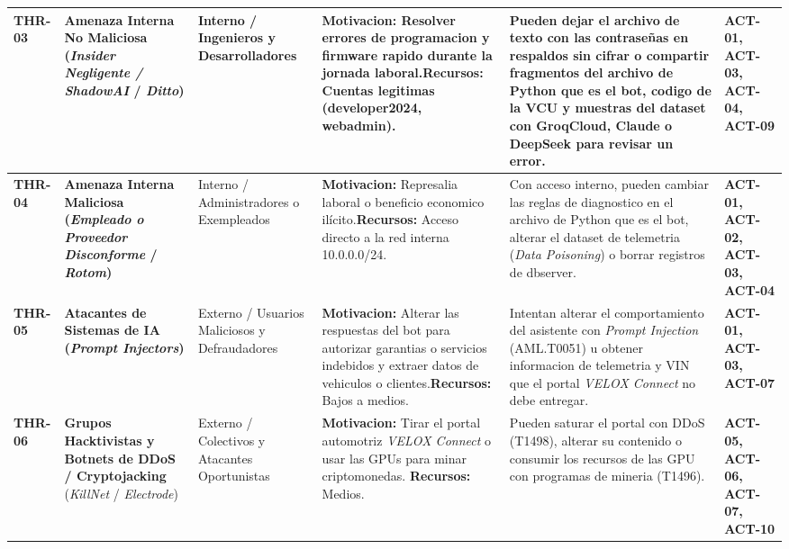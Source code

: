 \documentclass[letterpaper,11pt]{article}
\begin{document}
\begin{longtable}{|C{1.3cm}|L{2.9cm}|L{2.2cm}|L{2.8cm}|L{4.95cm}|C{2.0cm}|}
\textbf{THR-03}
  & \textbf{Amenaza Interna No Maliciosa (\textit{Insider Negligente /
ShadowAI} / \textit{Ditto})}
  & Interno / Ingenieros y Desarrolladores
  & \textbf{Motivacion:} Resolver errores de programacion y firmware
rapido durante la jornada laboral.\newline \textbf{Recursos:}
Cuentas legitimas (developer2024, webadmin).
  & Pueden dejar el archivo de texto con las contraseñas en respaldos
sin cifrar o compartir fragmentos del archivo de Python que es el
bot, codigo de la VCU y muestras del dataset con GroqCloud, Claude o
DeepSeek para revisar un error.
  & \textbf{ACT-01, ACT-03, ACT-04, ACT-09} \\
\hline

\textbf{THR-04}
  & \textbf{Amenaza Interna Maliciosa (\textit{Empleado o Proveedor
Disconforme} / \textit{Rotom})}
  & Interno / Administradores o Exempleados
  & \textbf{Motivacion:} Represalia laboral o beneficio economico
ilícito.\newline \textbf{Recursos:} Acceso directo a la red interna
10.0.0.0/24.
  & Con acceso interno, pueden cambiar las reglas de diagnostico en el
archivo de Python que es el bot, alterar el dataset de telemetria
(\textit{Data Poisoning}) o borrar registros de dbserver.
  & \textbf{ACT-01, ACT-02, ACT-03, ACT-04} \\
\hline

\textbf{THR-05}
  & \textbf{Atacantes de Sistemas de IA (\textit{Prompt Injectors})}
  & Externo / Usuarios Maliciosos y Defraudadores
  & \textbf{Motivacion:} Alterar las respuestas del bot para autorizar
garantias o servicios indebidos y extraer datos de vehiculos o
clientes.\newline \textbf{Recursos:} Bajos a medios.
  & Intentan alterar el comportamiento del asistente con \textit{Prompt
Injection} (AML.T0051) u obtener informacion de telemetria y VIN que
el portal \textit{VELOX Connect} no debe entregar.
  & \textbf{ACT-01, ACT-03, ACT-07} \\
\hline

\textbf{THR-06}
  & \textbf{Grupos Hacktivistas y Botnets de DDoS / Cryptojacking}
(\textit{KillNet} / \textit{Electrode})
  & Externo / Colectivos y Atacantes Oportunistas
  & \textbf{Motivacion:} Tirar el portal automotriz \textit{VELOX
Connect} o usar las GPUs para minar criptomonedas.\newline
\textbf{Recursos:} Medios.
  & Pueden saturar el portal con DDoS (T1498), alterar su contenido o
consumir los recursos de las GPU con programas de mineria (T1496).
  & \textbf{ACT-05, ACT-06, ACT-07, ACT-10} \\
\hline
\end{longtable}
\endgroup
\end{document}
